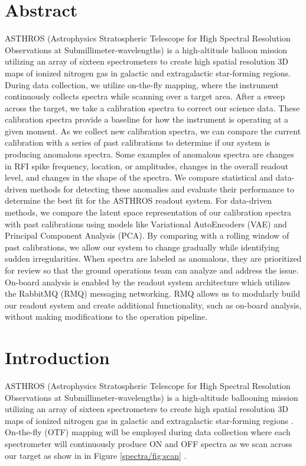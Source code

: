 \section{Abstract}
ASTHROS (Astrophysics Stratospheric Telescope for High Spectral Resolution Observations at Submillimeter-wavelengths) is a high-altitude balloon mission utilizing an array of sixteen spectrometers to create high spatial resolution 3D maps of ionized nitrogen gas in galactic and extragalactic star-forming regions.
During data collection, we utilize on-the-fly mapping, where the instrument continuously collects spectra while scanning over a target area.
After a sweep across the target, we take a calibration spectra to correct our science data.
These calibration spectra provide a baseline for how the instrument is operating at a given moment.
As we collect new calibration spectra, we can compare the current calibration with a series of past calibrations to determine if our system is producing anomalous spectra.
Some examples of anomalous spectra are changes in RFI spike frequency, location, or amplitudes, changes in the overall readout level, and changes in the shape of the spectra.
We compare statistical and data-driven methods for detecting these anomalies and evaluate their performance to determine the best fit for the ASTHROS readout system. For data-driven methods, we compare the latent space representation of our calibration spectra with past calibrations using models like Variational AutoEncoders (VAE) and Principal Component Analysis (PCA).
By comparing with a rolling window of past calibrations, we allow our system to change gradually while identifying sudden irregularities.
When spectra are labeled as anomalous, they are prioritized for review so that the ground operations team can analyze and address the issue.
On-board analysis is enabled by the readout system architecture which utilizes the RabbitMQ (RMQ) messaging networking.
RMQ allows us to modularly build our readout system and create additional functionality, such as on-board analysis, without making modifications to the operation pipeline. 


\section{Introduction}
ASTHROS (Astrophysics Stratospheric Telescope for High Spectral Resolution Observations at Submillimeter-wavelengths) is a high-altitude ballooning mission utilizing an array of sixteen spectrometers to create high spatial resolution 3D maps of ionized nitrogen gas in galactic and extragalactic star-forming regions \parencite{siles2020asthros}. 
On-the-fly (OTF) mapping will be employed during data collection where each spectrometer will continuously produce ON and OFF spectra as we scan across our target as show in in Figure \ref{spectra/fig:scan} \parencite{mangum2007fly}. 

